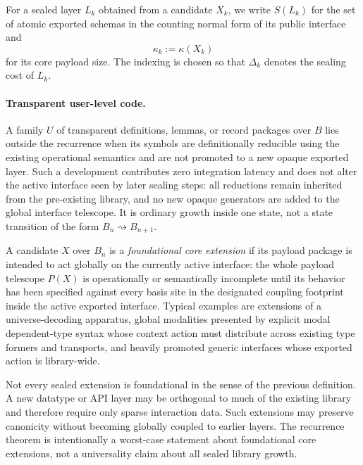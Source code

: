 \documentclass{lmcs}
\begin{document}
For a sealed layer \(L_k\) obtained from a candidate \(X_k\), we write \(S(L_k)\) for the set
of atomic exported schemas in the counting normal form of its public interface and
\[
  \kappa_k := \kappa(X_k)
\]
for its core payload size.  The indexing is chosen so that \(\Delta_k\) denotes the sealing cost
of \(L_k\).

\paragraph{Transparent user-level code.}
A family \(U\) of transparent definitions, lemmas, or record packages over \(B\) lies outside
the recurrence when its symbols are definitionally reducible using the existing operational
semantics and are not promoted to a new opaque exported layer.  Such a development contributes
zero integration latency and does not alter the active interface seen by later sealing steps:
all reductions remain inherited from the pre-existing library, and no new opaque generators are
added to the global interface telescope.  It is ordinary growth inside one state, not a state
transition of the form \(B_n\rightsquigarrow B_{n+1}\).

\begin{defi}
A candidate \(X\) over \(B_n\) is a \emph{foundational core extension} if its payload package is
intended to act globally on the currently active interface: the whole payload telescope
\(P(X)\) is operationally or semantically incomplete until its behavior has been specified
against every basis site in the designated coupling footprint inside the active exported
interface.  Typical examples are extensions of a universe-decoding apparatus, global
modalities presented by explicit modal dependent-type syntax whose context action must
distribute across existing type formers and transports, and heavily promoted generic
interfaces whose exported action is library-wide.
\end{defi}

\begin{rem}
\label{rem:sparse-extensions}
Not every sealed extension is foundational in the sense of the previous definition.  A new
datatype or API layer may be orthogonal to much of the existing library and therefore require
only sparse interaction data.  Such extensions may preserve canonicity without becoming
globally coupled to earlier layers.  The recurrence theorem is intentionally a worst-case
statement about foundational core extensions, not a universality claim about all sealed
library growth.
\end{rem}
\end{document}
